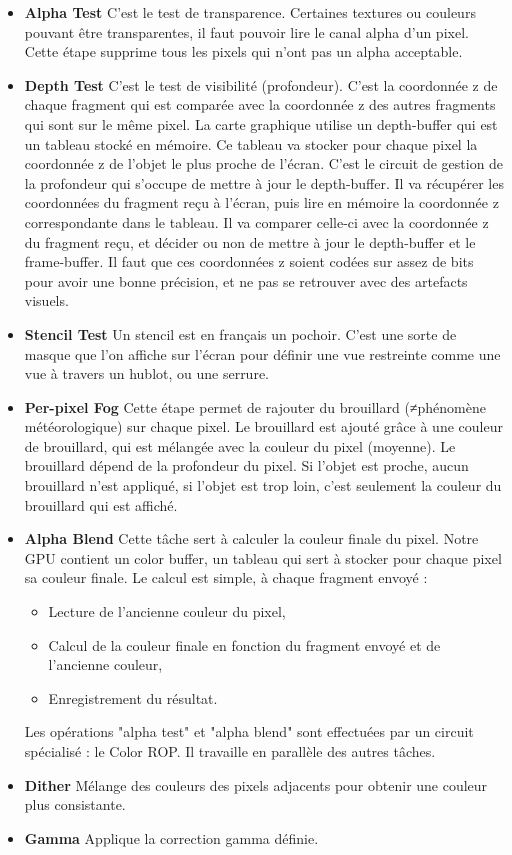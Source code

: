 \begin{itemize}
	\item{\textbf{Alpha Test}}
C’est le test de transparence. Certaines textures ou couleurs pouvant être transparentes, il faut pouvoir lire le canal alpha d’un pixel. Cette étape supprime tous les pixels qui n’ont pas un alpha acceptable.
\\
	\item{\textbf{Depth Test}}
C’est le test de visibilité (profondeur). C’est la coordonnée z de chaque fragment qui est comparée avec la coordonnée z des autres fragments qui sont sur le même pixel. La carte graphique utilise un depth-buffer qui est un tableau stocké en mémoire. Ce tableau va stocker pour chaque pixel la coordonnée z de l’objet le plus proche de l’écran.
C’est le circuit de gestion de la profondeur qui s’occupe de mettre à jour le depth-buffer. Il va récupérer les coordonnées du fragment reçu à l’écran, puis lire en mémoire la coordonnée z correspondante dans le tableau. Il va comparer celle-ci avec la coordonnée z du fragment reçu, et décider ou non de mettre à jour le depth-buffer et le frame-buffer.
Il faut que ces coordonnées z soient codées sur assez de bits pour avoir une bonne précision, et ne pas se retrouver avec des artefacts visuels.
\\
	\item{\textbf{Stencil Test}}
Un stencil est en  français un pochoir. C’est une sorte de masque que l’on affiche sur l’écran pour définir une vue restreinte comme une vue à travers un hublot, ou une serrure.
\\
	\item{\textbf{Per-pixel Fog}}
Cette étape permet de rajouter du brouillard (≠phénomène météorologique) sur chaque pixel. Le brouillard est ajouté grâce à une couleur de brouillard, qui est mélangée avec la couleur du pixel (moyenne). Le brouillard dépend de la profondeur du pixel. Si l’objet est proche, aucun brouillard n’est appliqué, si l’objet est trop loin, c’est seulement la couleur du brouillard qui est affiché.
\\
	\item{\textbf{Alpha Blend}}
Cette tâche sert à calculer la couleur finale du pixel. Notre GPU contient un color buffer, un tableau qui sert à stocker pour chaque pixel sa couleur finale.
Le calcul est simple, à chaque fragment envoyé :
\begin{itemize}
	\item Lecture de l’ancienne couleur du pixel,
	\item Calcul de la couleur finale en fonction du fragment envoyé et de l’ancienne couleur,
	\item Enregistrement du résultat.
\end{itemize}
Les opérations "alpha test" et "alpha blend" sont effectuées par un circuit spécialisé : le Color ROP. Il travaille en parallèle des autres tâches.
\\
	\item{\textbf{Dither}}
Mélange des couleurs des pixels adjacents pour obtenir une couleur plus consistante.
\\
	\item{\textbf{Gamma}}
Applique la correction gamma définie.
\end{itemize}

